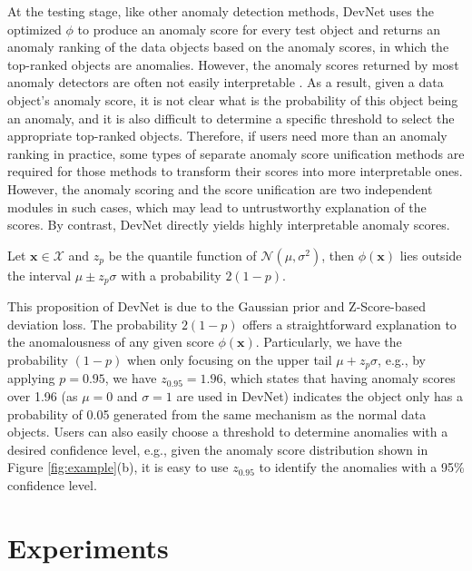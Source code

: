 \documentclass[sigconf]{acmart}
\begin{document}
At the testing stage, like other anomaly detection methods, DevNet uses the optimized $\phi$ to produce an anomaly score for every test object and returns an anomaly ranking of the data objects based on the anomaly scores, in which the top-ranked objects are anomalies. However, the anomaly scores returned by most anomaly detectors are often not easily interpretable \cite{kriegel2011interpreting}. As a result, given a data object's anomaly score, it is not clear what is the probability of this object being an anomaly, and it is also difficult to determine a specific threshold to select the appropriate top-ranked objects. Therefore, if users need more than an anomaly ranking in practice, some types of separate anomaly score unification methods \cite{kriegel2011interpreting} are required for those methods to transform their scores into more interpretable ones. However, the anomaly scoring and the score unification are two independent modules in such cases, which may lead to untrustworthy explanation of the scores. By contrast, DevNet directly yields highly interpretable anomaly scores.

\begin{proposition}
Let $\mathbf{x} \in \mathcal{X}$ and $z_{p}$ be the quantile function of $\mathcal{N}(\mu, \sigma^{2})$, then $\phi(\mathbf{x})$ lies outside the interval $\mu \pm z_{p}\sigma $ with a probability $2(1-p)$.
\end{proposition}

This proposition of DevNet is due to the Gaussian prior and Z-Score-based deviation loss. The probability $2(1-p)$ offers a straightforward explanation to the anomalousness of any given score $\phi(\mathbf{x})$. Particularly, we have the probability $(1-p)$ when only focusing on the upper tail $\mu + z_{p}\sigma $, e.g., by applying $p=0.95$, we have $z_{0.95}=1.96$, which states that having anomaly scores over 1.96 (as $\mu=0$ and $ \sigma=1 $ are used in DevNet) indicates the object only has a probability of 0.05 generated from the same mechanism as the normal data objects. Users can also easily choose a threshold to determine anomalies with a desired confidence level, e.g., given the anomaly score distribution shown in Figure \ref{fig:example}(b), it is easy to use $z_{0.95}$ to identify the anomalies with a 95\% confidence level.





\section{Experiments}
\end{document}
